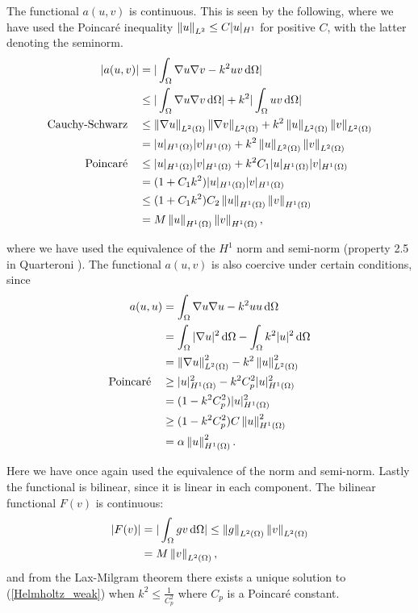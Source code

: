 \documentclass[10pt,a4paper]{article}
\begin{document}
The functional $a(u,v)$ is continuous. This is seen by the following, where we have used the Poincaré inequality $\left\|u\right\|_{L^2} \leq C |u|_{H^1}$ for positive $C$, with the latter denoting the seminorm.
\begin{align*}
|a(u,v)| &= |\int_\Omega  \nabla u \nabla v - k^2 u v \, \mathrm{d} \Omega| \\
 		& \leq |\int_\Omega \nabla u \nabla v \, \mathrm{d} \Omega| + k^2 |\int_\Omega u v \, \mathrm{d} \Omega| \\
 		\text{Cauchy-Schwarz} \quad & \leq \left\|\nabla u\right\|_{L^2(\Omega)} \left\|\nabla v\right\|_{L^2(\Omega)} + k^2 \left\|u\right\|_{L^2(\Omega)} \left\|v\right\|_{L^2(\Omega)} \\
		& = |u|_{H^1(\Omega)} |v|_{H^1(\Omega)} + k^2 \left\|u\right\|_{L^2(\Omega)} \left\|v\right\|_{L^2(\Omega)} \\
		\text{Poincaré} \quad & \leq |u|_{H^1(\Omega)} |v|_{H^1(\Omega)} + k^2 C_1 |{u}|_{H^1(\Omega)} |{v}|_{H^1(\Omega)} \\
		& = (1 + C_1 k^2) |u|_{H^1(\Omega)} |v|_{H^1(\Omega)} \\
		& \leq (1 + C_1 k^2) C_2 \left\|u\right\|_{H^1(\Omega)} \left\|v\right\|_{H^1(\Omega)} \\
		&= M \left\|u\right\|_{H^1(\Omega)} \left\|v\right\|_{H^1(\Omega)},
\end{align*}

where we have used the equivalence of the $H^1$ norm and semi-norm (property 2.5 in Quarteroni \cite{Quarteroni}).
The functional $a(u,v)$ is also coercive under certain conditions, since
\begin{align*}
a(u,u) &= \int_\Omega  \nabla u \nabla u - k^2 u u \, \mathrm{d} \Omega \\
 		& = \int_\Omega  |\nabla u|^2 \, \mathrm{d} \Omega - \int_{\Omega} k^2 |u|^2 \, \mathrm{d} \Omega \\
 		& =  \left\|\nabla u\right\|_{L^2(\Omega)}^2 - k^2 \left\|u\right\|_{L^2(\Omega)}^2\\
\text{Poincaré} \quad & \geq |u|^2_{H^1(\Omega)} - k^2 C_p^2 |u|^2_{H^1(\Omega)} \\
		& = (1 - k^2 C_p^2) |u|^2_{H^1(\Omega)} \\
		& \geq (1 - k^2 C_p^2) C \left\|u\right\|^2_{H^1(\Omega)} \\
		& = \alpha \left\|u\right\|^2_{H^1(\Omega)}.
\end{align*}

Here we have once again used the equivalence of the norm and semi-norm. Lastly the functional is bilinear, since it is linear in each component. The bilinear functional $F(v)$ is continuous:
\begin{align*}
|F(v)| &= |\int_\Omega gv \, \mathrm{d} \Omega| \leq \left\|g\right\|_{L^2(\Omega)} \left\|v\right\|_{L^2(\Omega)} \\
       &= M \left\|v\right\|_{L^2(\Omega)},
\end{align*}
and from the Lax-Milgram theorem there exists a unique solution to (\ref{Helmholtz_weak}) when $k^2 \leq \frac{1}{C_p^2}$ where $C_p$ is a Poincaré constant.
\end{document}
